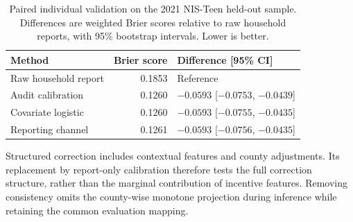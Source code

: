 \documentclass[sigconf,review]{acmart}
\begin{document}
\begin{table}[tbp]
\centering
\caption{Paired individual validation on the 2021 NIS-Teen
held-out sample. Differences are weighted Brier scores
relative to raw household reports, with 95\% bootstrap
intervals. Lower is better.}
\label{tab:nis-teen-validation}
\small
\setlength{\tabcolsep}{3pt}
\renewcommand{\arraystretch}{1.02}
\begin{tabularx}{\columnwidth}{
@{}
>{\raggedright\arraybackslash}X
r
>{\centering\arraybackslash}p{}
@{}}
\toprule
Method & Brier score & Difference [95\% CI] \\
\midrule
Raw household report
& 0.1853 & Reference \\
Audit calibration
& 0.1260 & $-0.0593$ [$-0.0753$, $-0.0439$] \\
Covariate logistic
& 0.1260 & $-0.0593$ [$-0.0755$, $-0.0435$] \\
Reporting channel
& 0.1261 & $-0.0593$ [$-0.0756$, $-0.0435$] \\
\bottomrule
\end{tabularx}
\end{table}


Structured correction includes contextual features and county adjustments. Its replacement by report-only calibration therefore tests the full correction structure, rather than the marginal contribution of incentive features. Removing consistency omits the county-wise monotone projection during inference while retaining the common evaluation mapping.














% 
% 
\end{document}
